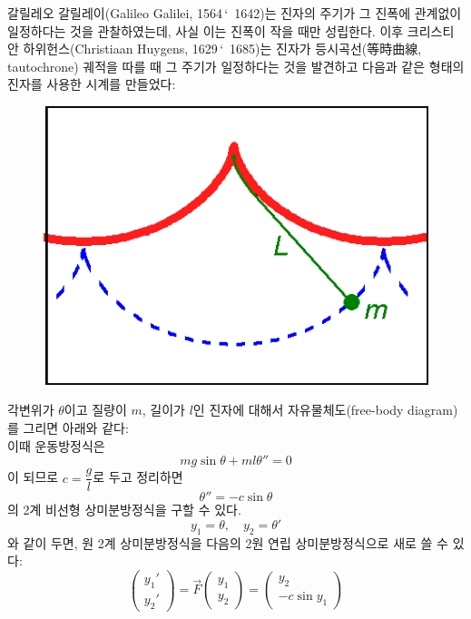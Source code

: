 \documentclass[../engineering_mathematics_lecture_note.tex]{subfiles}
\begin{document}
\begin{example}
    갈릴레오 갈릴레이(Galileo Galilei, 1564\,\char`~1642)는 진자의 주기가 그 진폭에 관계없이 일정하다는 것을 관찰하였는데, 사실 이는 진폭이 작을 때만 성립한다.
    이후 크리스티안 하위헌스(Christiaan Huygens, 1629\,\char`~1685)는 진자가 등시곡선(等時曲線, tautochrone) 궤적을 따를 때 그 주기가 일정하다는 것을 발견하고 다음과 같은 형태의 진자를 사용한 시계를 만들었다:
    \begin{figure}[H]
        \centering
        \includegraphics[width=0.8\linewidth]{plots/cycloid_pendulum.png}
        \label{fig:plots/cycloid_pendulum.png}
    \end{figure}

    각변위가 $\theta$이고 질량이 $m$, 길이가 $l$인 진자에 대해서 자유물체도(free-body diagram)를 그리면 아래와 같다:\\
    이때 운동방정식은
    \begin{equation*}
        mg \sin \theta + ml \theta'' = 0
    \end{equation*}
    이 되므로 $c = \dfrac gl$로 두고 정리하면
    \begin{equation*}
        \theta'' = -c \sin \theta
    \end{equation*}
    의 2계 비선형 상미분방정식을 구할 수 있다.
    \begin{equation*}
        y_1 = \theta, \quad y_2 = \theta'
    \end{equation*}
    와 같이 두면, 원 2계 상미분방정식을 다음의 2원 연립 상미분방정식으로 새로 쓸 수 있다:
    \begin{equation*}
        \begin{pmatrix}
            y_1' \\ y_2'
        \end{pmatrix} = \vec F \begin{pmatrix}
            y_1 \\ y_2
        \end{pmatrix} = \begin{pmatrix}
            y_2 \\ -c \sin y_1
        \end{pmatrix}
    \end{equation*}


\end{example}
\end{document}
